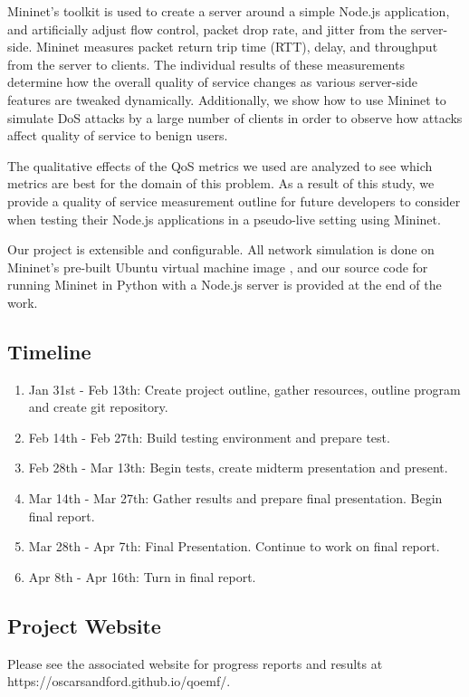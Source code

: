 \documentclass{article}
\begin{document}
Mininet's toolkit is used to create a server around a simple Node.js application, and artificially adjust flow control, packet drop rate, and jitter from the server-side. 
Mininet measures packet return trip time (RTT), delay, and throughput from the server to clients. The individual results of these measurements determine how the overall 
quality of service changes as various server-side features are tweaked dynamically. Additionally, we show how to use Mininet to simulate DoS attacks by a large number 
of clients in order to observe how attacks affect quality of service to benign users.

The qualitative effects of the QoS metrics we used are analyzed to see which metrics are best for the domain of this problem. As a result of this study, we provide a 
quality of service measurement outline for future developers to consider when testing their Node.js applications in a pseudo-live setting using Mininet. 

Our project is extensible and configurable. All network simulation is done on Mininet's pre-built Ubuntu virtual machine image \cite{mininet_github_2021}, and our 
source code for running Mininet in Python with a Node.js server is provided at the end of the work. 

\subsection{Timeline}
\begin{enumerate}
    \item Jan 31st - Feb 13th: Create project outline, gather resources, outline program and create git repository.
    \item Feb 14th - Feb 27th: Build testing environment and prepare test.
    \item Feb 28th - Mar 13th: Begin tests, create midterm presentation and present. 
    \item Mar 14th - Mar 27th: Gather results and prepare final presentation. Begin final report.
    \item Mar 28th - Apr 7th: Final Presentation. Continue to work on final report.
    \item Apr 8th - Apr 16th: Turn in final report.
\end{enumerate}

\subsection{Project Website}
Please see the associated website for progress reports and results at https://oscarsandford.github.io/qoemf/.
\end{document}
